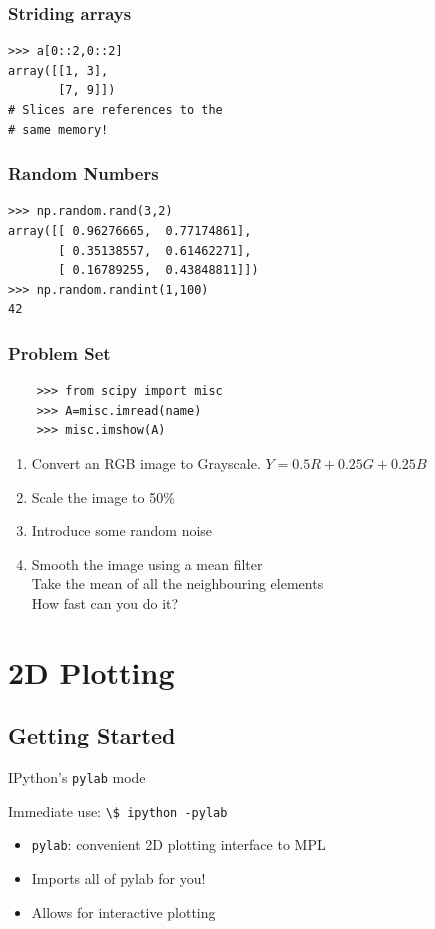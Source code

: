 \documentclass[14pt,compress]{beamer}
\newcounter{time}
\newcommand{\inctime}[1]{\addtocounter{time}{#1}{\tiny \thetime\ m}}
\newcommand{\typ}[1]{\lstinline{#1}}
\begin{document}
\begin{frame}[fragile]
  \frametitle{Striding arrays}
\begin{lstlisting}
>>> a[0::2,0::2]
array([[1, 3],
       [7, 9]])
# Slices are references to the 
# same memory!
\end{lstlisting}
\end{frame}

\begin{frame}[fragile]
\frametitle{Random Numbers}
\begin{lstlisting}
>>> np.random.rand(3,2)
array([[ 0.96276665,  0.77174861],
       [ 0.35138557,  0.61462271],
       [ 0.16789255,  0.43848811]])
>>> np.random.randint(1,100)
42
\end{lstlisting}
\inctime{15}
\end{frame}

\begin{frame}[fragile]
  \frametitle{Problem Set}
  \begin{lstlisting}
    >>> from scipy import misc
    >>> A=misc.imread(name)
    >>> misc.imshow(A)
  \end{lstlisting}
    \begin{enumerate}
    \item Convert an RGB image to Grayscale. $ Y = 0.5R + 0.25G + 0.25B $
    \item Scale the image to 50\%
    \item Introduce some random noise
    \item Smooth the image using a mean filter
      \\\small{Take the mean of all the neighbouring elements}
      \\\small{How fast can you do it?}
    \end{enumerate}
\inctime{15}
\end{frame}

\section{2D Plotting}
\subsection{Getting Started}

\begin{frame}
    {IPython's \typ{pylab} mode}
\begin{block}{Immediate use:}
 \typ{\$ ipython -pylab}
\end{block}
\begin{itemize}
    \item \typ{pylab}: convenient 2D plotting interface to MPL    
    \item Imports all of pylab for you!
    \item Allows for interactive plotting
\end{itemize}
\end{frame}
\end{document}
